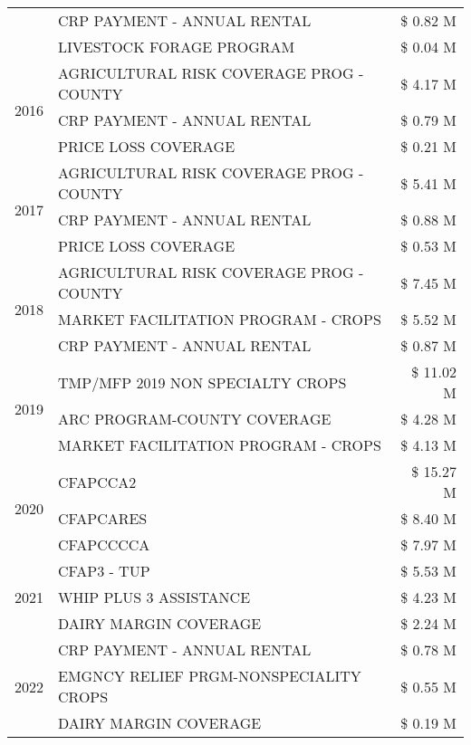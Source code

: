 \begin{tabular}{llr}
 & CRP PAYMENT - ANNUAL RENTAL & \$ 0.82 M \\
 & LIVESTOCK FORAGE PROGRAM & \$ 0.04 M \\
\cline{1-3}
\multirow[t]{3}{*}{2016} & AGRICULTURAL RISK COVERAGE PROG - COUNTY & \$ 4.17 M \\
 & CRP PAYMENT - ANNUAL RENTAL & \$ 0.79 M \\
 & PRICE LOSS COVERAGE & \$ 0.21 M \\
\cline{1-3}
\multirow[t]{3}{*}{2017} & AGRICULTURAL RISK COVERAGE PROG - COUNTY & \$ 5.41 M \\
 & CRP PAYMENT - ANNUAL RENTAL & \$ 0.88 M \\
 & PRICE LOSS COVERAGE & \$ 0.53 M \\
\cline{1-3}
\multirow[t]{3}{*}{2018} & AGRICULTURAL RISK COVERAGE PROG - COUNTY & \$ 7.45 M \\
 & MARKET FACILITATION PROGRAM - CROPS & \$ 5.52 M \\
 & CRP PAYMENT - ANNUAL RENTAL & \$ 0.87 M \\
\cline{1-3}
\multirow[t]{3}{*}{2019} & TMP/MFP 2019 NON SPECIALTY CROPS & \$ 11.02 M \\
 & ARC PROGRAM-COUNTY COVERAGE & \$ 4.28 M \\
 & MARKET FACILITATION PROGRAM - CROPS & \$ 4.13 M \\
\cline{1-3}
\multirow[t]{3}{*}{2020} & CFAPCCA2 & \$ 15.27 M \\
 & CFAPCARES & \$ 8.40 M \\
 & CFAPCCCCA & \$ 7.97 M \\
\cline{1-3}
\multirow[t]{3}{*}{2021} & CFAP3 - TUP & \$ 5.53 M \\
 & WHIP PLUS 3 ASSISTANCE & \$ 4.23 M \\
 & DAIRY MARGIN COVERAGE & \$ 2.24 M \\
\cline{1-3}
\multirow[t]{3}{*}{2022} & CRP PAYMENT - ANNUAL RENTAL & \$ 0.78 M \\
 & EMGNCY RELIEF PRGM-NONSPECIALITY CROPS & \$ 0.55 M \\
 & DAIRY MARGIN COVERAGE & \$ 0.19 M \\
\cline{1-3}
\bottomrule
\end{tabular}
